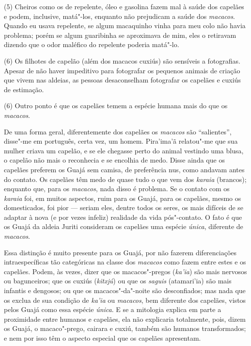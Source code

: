 (5) Cheiros como os de repelente, óleo e gasolina fazem mal à saúde dos
capelães e podem, inclusive, matá"-los, enquanto não prejudicam a saúde
dos \emph{macacos}. Quando eu usava repelente, se algum macaquinho vinha
para meu colo não havia problema; porém se algum guaribinha se
aproximava de mim, eles o retiravam dizendo que o odor maléfico do
repelente poderia matá"-lo.

(6) Os filhotes de capelão (além dos macacos cuxiús) são sensíveis a
fotografias. Apesar de não haver impeditivo para fotografar os pequenos
animais de criação que vivem nas aldeias, as pessoas desaconselham
fotografar os capelães e cuxiús de estimação.

(6) Outro ponto é que os capelães temem a espécie humana mais do que os
\emph{macacos}.

De uma forma geral, diferentemente dos capelães os \emph{macacos} são
``salientes'', disse"-me em português, certa vez, um homem. Pira'ima'ã
relatou"-me que sua mulher criava um capelão, e se ele chegasse perto do
animal vestindo uma blusa, o capelão não mais o reconhecia e se encolhia
de medo. Disse ainda que os capelães preferem os Guajá sem camisa, de
preferência nus, como andavam antes do contato. Os capelães têm medo de
quase tudo o que vem dos \emph{karaia} (brancos); enquanto que, para os
\emph{macacos}, nada disso é problema. Se o contato com os \emph{karaia}
foi, em muitos aspectos, ruim para os Guajá, para os capelães, mesmo os
domesticados, foi pior --- seriam eles, dentre todos os seres, os mais
difíceis de se adaptar à nova (e por vezes infeliz) realidade da vida
pós"-contato. O fato é que os Guajá da aldeia Juriti consideram os
capelães uma espécie \emph{única}, diferente de \emph{macacos}.

Essa distinção é muito presente para os Guajá, por não fazerem
diferenciações intraespecíficas tão categóricas na classe dos
\emph{macacos} como fazem entre estes e os capelães. Podem, às vezes,
dizer que os macacos"-pregos (\emph{ka'ia}) são mais nervosos ou
bagunceiros; que os cuxiús (\emph{kitxjú}) ou que os \emph{saguis}
(atamari'ia) são mais infantis e dengosos; ou que os macacos"-da"-noite
são desconfiados; mas nada que os exclua de sua condição de \emph{ka'ia}
ou \emph{macacos}, bem diferente dos capelães, vistos pelos Guajá como
essa espécie \emph{única}. E se a mitologia explica em parte a
proximidade entre humanos e capelães, ela não explicaria totalmente,
pois, dizem os Guajá, o macaco"-prego, cairara e cuxiú, também são
humanos transformados; e nem por isso têm o aspecto especial que os
capelães apresentam.

